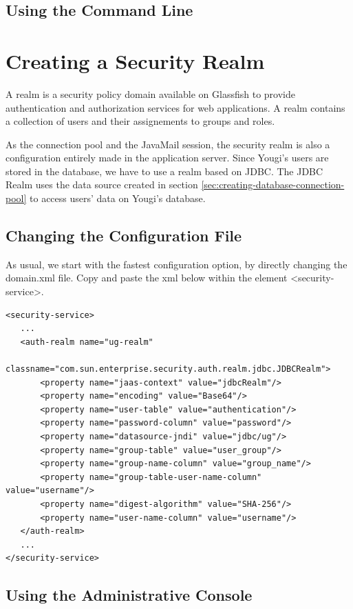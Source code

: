 \documentclass[envcountsame,envcountchap]{svmono}
\begin{document}
\subsection{Using the Command Line}

\section{Creating a Security Realm}

A realm is a security policy domain available on Glassfish to provide authentication and authorization services for web applications. A realm contains a collection of users and their assignements to groups and roles.

As the connection pool and the JavaMail session, the security realm is also a configuration entirely made in the application server. Since Yougi's users are stored in the database, we have to use a realm based on JDBC. The JDBC Realm uses the data source created in section \ref{sec:creating-database-connection-pool} to access users' data on Yougi's database.

\subsection{Changing the Configuration File}

As usual, we start with the fastest configuration option, by directly changing the domain.xml file. Copy and paste the xml below within the element \textless security-service\textgreater .

\begin{verbatim}
<security-service>
   ...
   <auth-realm name="ug-realm"
       classname="com.sun.enterprise.security.auth.realm.jdbc.JDBCRealm">
       <property name="jaas-context" value="jdbcRealm"/>
       <property name="encoding" value="Base64"/>
       <property name="user-table" value="authentication"/>          
       <property name="password-column" value="password"/>
       <property name="datasource-jndi" value="jdbc/ug"/>
       <property name="group-table" value="user_group"/>
       <property name="group-name-column" value="group_name"/>
       <property name="group-table-user-name-column" value="username"/>
       <property name="digest-algorithm" value="SHA-256"/>
       <property name="user-name-column" value="username"/>
   </auth-realm>
   ...
</security-service>
\end{verbatim}

\subsection{Using the Administrative Console}
\end{document}

